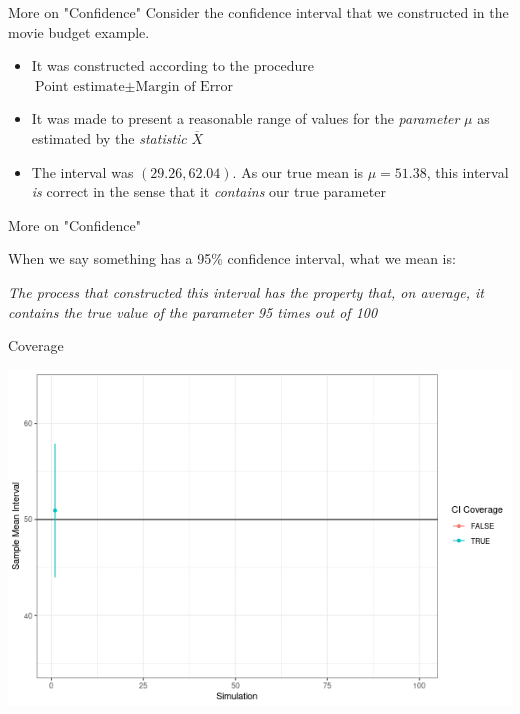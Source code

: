 \documentclass{beamer}
\begin{document}
\begin{frame}{More on "Confidence"}
Consider the confidence interval that we constructed in the movie budget example.

\begin{itemize}
\item It was constructed according to the procedure $\text{Point estimate} \pm \text{Margin of Error}$
\item It was made to present a reasonable range of values for the \textit{parameter} $\mu$ as estimated by the \textit{statistic} $\overline{X}$
\item The interval was $(29.26, 62.04)$. As our true mean is $\mu = 51.38$, this interval \textit{is} correct in the sense that it \textit{contains} our true parameter
\end{itemize}
\end{frame}

\begin{frame}{More on "Confidence"}

When we say something has a 95\% confidence interval, what we mean is:
\\

\vspace{3mm}

 \textit{The process that constructed this interval has the property that, on average, it contains the true value of the parameter 95 times out of 100}
\end{frame}

\begin{frame}{Coverage}
\begin{center}
\includegraphics[scale=0.5]{cover1.png}
\end{center}
\end{frame}
\end{document}
